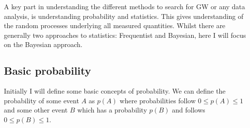 A key part in understanding the different methods to search for \ac{GW} or any data analysis, is understanding probability and statistics. 
This gives understanding of the random processes underlying all measured quantities. 
Whilst there are generally two approaches to statistics: Frequentist and Bayesian, here I will focus on the Bayesian approach.  

\subsection{\label{intro:prob:basic}Basic probability}

Initially I will define some basic concepts of probability.
We can define the probability of some event $A$ as $p(A)$ where probabilities follow $0 \leq p(A) \leq 1$ and some other event $B$ which has a probability $p(B)$ and follows $0 \leq p(B) \leq 1$.

